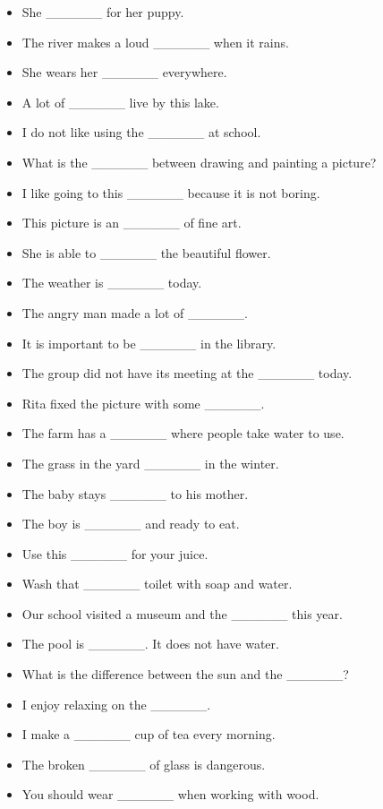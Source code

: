 \documentclass{article}
\begin{document}
\begin{addmargin}[1em]{1em}
\begin{itemize}
    \item She \_\_\_\_\_\_ for her puppy.
    \item The river makes a loud \_\_\_\_\_\_ when it rains.
    \item She wears her \_\_\_\_\_\_ everywhere.
    \item A lot of \_\_\_\_\_\_ live by this lake.
    \item I do not like using the \_\_\_\_\_\_ at school.
    \item What is the \_\_\_\_\_\_ between drawing and painting a picture?
    \item I like going to this \_\_\_\_\_\_ because it is not boring.
    \item This picture is an \_\_\_\_\_\_ of fine art.
    \item She is able to \_\_\_\_\_\_ the beautiful flower.
    \item The weather is \_\_\_\_\_\_ today.
    \item The angry man made a lot of \_\_\_\_\_\_.
    \item It is important to be \_\_\_\_\_\_ in the library.
    \item The group did not have its meeting at the \_\_\_\_\_\_ today.
    \item Rita fixed the picture with some \_\_\_\_\_\_.
    \item The farm has a \_\_\_\_\_\_ where people take water to use.
    \item The grass in the yard \_\_\_\_\_\_ in the winter.
    \item The baby stays \_\_\_\_\_\_ to his mother.
    \item The boy is \_\_\_\_\_\_ and ready to eat.
    \item Use this \_\_\_\_\_\_ for your juice.
    \item Wash that \_\_\_\_\_\_ toilet with soap and water.
    \item Our school visited a museum and the \_\_\_\_\_\_ this year.
    \item The pool is \_\_\_\_\_\_. It does not have water.
    \item What is the difference between the sun and the \_\_\_\_\_\_?
    \item I enjoy relaxing on the \_\_\_\_\_\_.
    \item I make a \_\_\_\_\_\_ cup of tea every morning.
    \item The broken \_\_\_\_\_\_ of glass is dangerous.
    \item You should wear \_\_\_\_\_\_ when working with wood.

\end{itemize}
\end{addmargin}
\end{document}
